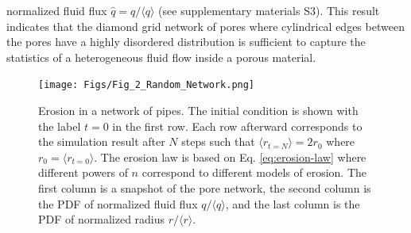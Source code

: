 \documentclass[%
 reprint,
 amsmath,amssymb,
 aps,
]{revtex4-1}
\newcommand{\AZ}[1]{\noindent \color{purple} (AZ: #1)\normalcolor}
\begin{document}
normalized fluid flux $\hat{q} = {q}/\langle q \rangle$ (see supplementary materials S3). This result indicates that the diamond grid network of pores where cylindrical edges between the pores have a highly disordered distribution is sufficient to capture the statistics of a heterogeneous fluid flow inside a porous material. 
 
 
%


\begin{figure}[!h]
    \texttt{[image: Figs/Fig\_2\_Random\_Network.png]}
    \caption{Erosion in a network of pipes. The initial condition is shown with the label $t=0$ in the first row. Each row afterward corresponds to the simulation result after $N$ steps such that $\langle r_{t=N}\rangle=2r_0$ where $r_0 = \langle r_{t=0}\rangle$. The erosion law is based on Eq. \eqref{eq:erosion-law} where different powers of $n$ correspond to different models of erosion. The first column is a snapshot of the pore network, the second column is the PDF of normalized fluid flux $q/\langle q \rangle$, and the last column is the PDF of normalized radius $r/\langle r\rangle$.}\label{fig:fig2}
\end{figure}
%
\end{document}
